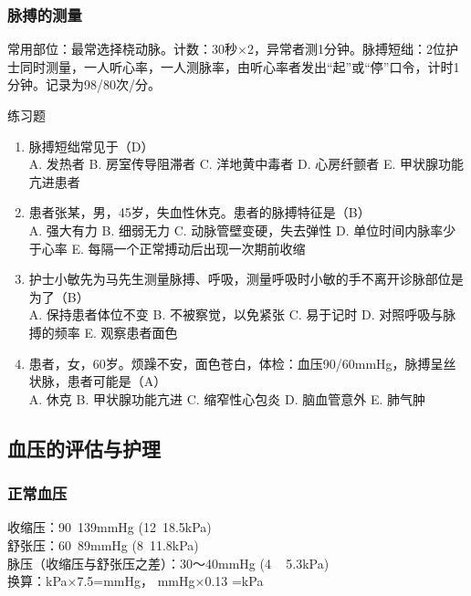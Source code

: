 \documentclass[11pt, a4paper]{ctexart}
\begin{document}
\subsubsection{脉搏的测量}
常用部位：最常选择桡动脉。计数：30秒×2，异常者测1分钟。脉搏短绌：2位护士同时测量，一人听心率，一人测脉率，由听心率者发出“起”或“停”口令，计时1分钟。记录为98/80次/分。

\begin{examplebox}{练习题}
\begin{enumerate}
    \item 脉搏短绌常见于（D）\\
    A. 发热者 \quad B. 房室传导阻滞者 \quad C. 洋地黄中毒者 \quad D. 心房纤颤者 \quad E. 甲状腺功能亢进患者
    \item 患者张某，男，45岁，失血性休克。患者的脉搏特征是（B）\\
    A. 强大有力 \quad B. 细弱无力 \quad C. 动脉管壁变硬，失去弹性 \quad D. 单位时间内脉率少于心率 \quad E. 每隔一个正常搏动后出现一次期前收缩
    \item 护士小敏先为马先生测量脉搏、呼吸，测量呼吸时小敏的手不离开诊脉部位是为了（B）\\
    A. 保持患者体位不变 \quad B. 不被察觉，以免紧张 \quad C. 易于记时 \quad D. 对照呼吸与脉搏的频率 \quad E. 观察患者面色
    \item 患者，女，60岁。烦躁不安，面色苍白，体检：血压90/60mmHg，脉搏呈丝状脉，患者可能是（A）\\
    A. 休克 \quad B. 甲状腺功能亢进 \quad C. 缩窄性心包炎 \quad D. 脑血管意外 \quad E. 肺气肿
\end{enumerate}
\end{examplebox}

\subsection{血压的评估与护理}
\subsubsection{正常血压}
收缩压：90~139mmHg (12~18.5kPa) \\
舒张压：60~89mmHg (8~11.8kPa) \\
脉压（收缩压与舒张压之差）：30～40mmHg (4 ~ 5.3kPa) \\
换算：kPa×7.5=mmHg， mmHg×0.13 =kPa
\end{document}
